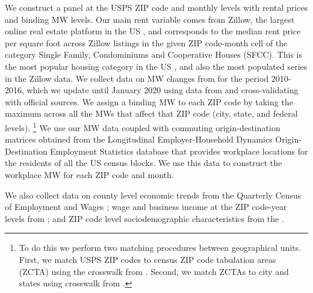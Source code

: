 We construct a panel at the USPS ZIP code and monthly levels with rental prices 
and binding MW levels.
Our main rent variable comes from Zillow, the largest online real estate platform 
in the US \parencite{realestateagentpdx, investopedia}, and corresponds to the 
median rent price per square foot across Zillow listings in the given ZIP code-month 
cell of the category Single Family, Condominiums and Cooperative Houses (SFCC).
This is the most popular housing category in the US \parencite{Fernald2020}, 
and also the most populated series in the Zillow data.
We collect data on MW changes from \textcite{VaghulZipperer2016} for the period 
2010-2016, which we update until January 2020 using data from 
\textcite{BerkeleyLaborCenter} and cross-validating with official sources.
We assign a binding MW to each ZIP code by taking the maximum across all the
MWs that affect that ZIP code (city, state, and federal levels).%
\footnote{To do this we perform two matching procedures between geographical units.
First, we match USPS ZIP codes to census ZIP code tabulation areas (ZCTA) using 
the crosswalk from \textcite{UDSMapper}. Second, we match ZCTAs to city and states 
using crosswalk from \textcite{MissouriCenter}.}
We use our MW data coupled with commuting origin-destination matrices obtained 
from the Longitudinal Employer-Household Dynamics Origin-Destination Employment 
Statistics \parencite[LODES;][]{LODES} database that provides workplace locations
for the residents of all the US census blocks. We use this data to construct 
the workplace MW for each ZIP code and month.

We also collect data on county level economic trends from the Quarterly Census 
of Employment and Wages \textcite[QCEW;][]{QCEW}; wage and business income 
at the ZIP code-year levels from \textcite{IRS}; and ZIP code level 
sociodemographic characteristics from the \textcite{ACS}.


